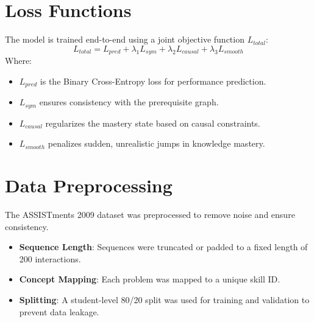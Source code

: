 \section{Loss Functions}
The model is trained end-to-end using a joint objective function $L_{total}$:
\begin{equation}
    L_{total} = L_{pred} + \lambda_1 L_{sym} + \lambda_2 L_{causal} + \lambda_3 L_{smooth}
\end{equation}
Where:
\begin{itemize}
    \item $L_{pred}$ is the Binary Cross-Entropy loss for performance prediction.
    \item $L_{sym}$ ensures consistency with the prerequisite graph.
    \item $L_{causal}$ regularizes the mastery state based on causal constraints.
    \item $L_{smooth}$ penalizes sudden, unrealistic jumps in knowledge mastery.
\end{itemize}

\section{Data Preprocessing}
The ASSISTments 2009 dataset was preprocessed to remove noise and ensure consistency.
\begin{itemize}
    \item \textbf{Sequence Length}: Sequences were truncated or padded to a fixed length of 200 interactions.
    \item \textbf{Concept Mapping}: Each problem was mapped to a unique skill ID.
    \item \textbf{Splitting}: A student-level 80/20 split was used for training and validation to prevent data leakage.
\end{itemize}
